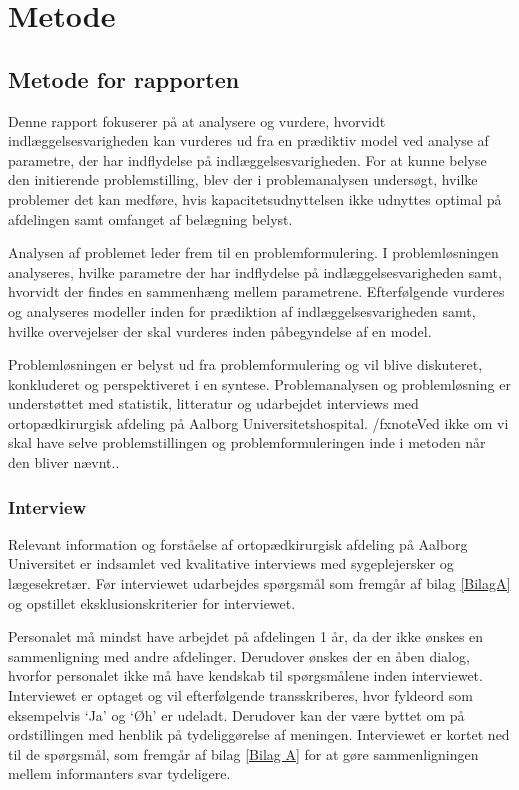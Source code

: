 \chapter*{Metode}
\section*{Metode for rapporten}
Denne rapport fokuserer på at analysere og vurdere, hvorvidt indlæggelsesvarigheden kan vurderes ud fra en prædiktiv model ved analyse af parametre, der har indflydelse på indlæggelsesvarigheden. For at kunne belyse den initierende problemstilling, blev der i problemanalysen undersøgt, hvilke problemer det kan medføre, hvis kapacitetsudnyttelsen ikke udnyttes optimal på afdelingen samt omfanget af belægning belyst.

Analysen af problemet leder frem til en problemformulering. I problemløsningen analyseres, hvilke parametre der har indflydelse på indlæggelsesvarigheden samt, hvorvidt der findes en sammenhæng mellem parametrene. Efterfølgende vurderes og analyseres modeller inden for prædiktion af indlæggelsesvarigheden samt, hvilke overvejelser der skal vurderes inden påbegyndelse af en model. 


Problemløsningen er belyst ud fra problemformulering og vil blive diskuteret, konkluderet og perspektiveret i en syntese. Problemanalysen og problemløsning er understøttet med statistik, litteratur og udarbejdet interviews med ortopædkirurgisk afdeling på Aalborg Universitetshospital.  /fxnote{Ved ikke om vi skal have selve problemstillingen og problemformuleringen inde i metoden når den bliver nævnt.}. 


\subsection*{Interview}
Relevant information og forståelse af ortopædkirurgisk afdeling på Aalborg Universitet er indsamlet ved kvalitative interviews med sygeplejersker og lægesekretær. Før interviewet udarbejdes spørgsmål som fremgår af bilag \ref{BilagA} og opstillet eksklusionskriterier for interviewet. 

Personalet må mindst have arbejdet på afdelingen 1 år, da der ikke ønskes en sammenligning med andre afdelinger. Derudover ønskes der en åben dialog, hvorfor personalet ikke må have kendskab til spørgsmålene inden interviewet. Interviewet er optaget og vil efterfølgende transskriberes, hvor fyldeord som eksempelvis ‘Ja’  og ‘Øh’ er udeladt. Derudover kan der være byttet om på ordstillingen med henblik på tydeliggørelse af meningen. Interviewet er kortet ned til de spørgsmål, som fremgår af bilag \ref{Bilag A} for at gøre sammenligningen mellem informanters svar tydeligere.  


